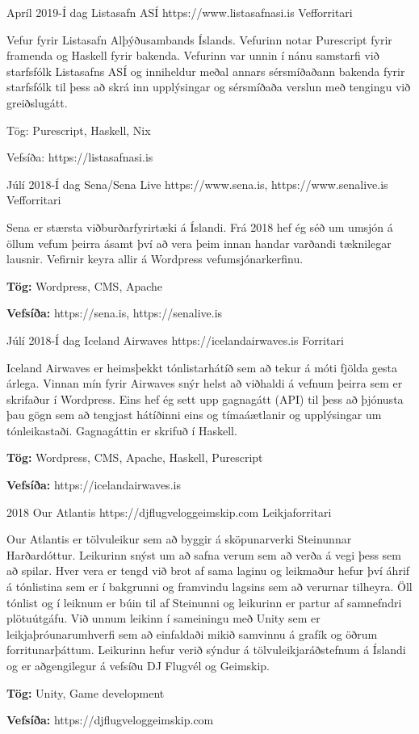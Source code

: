 \documentclass[10pt]{article} %
\begin{document}
\job
{Apríl 2019-}{Í dag}
{Listasafn ASÍ}
{https://www.listasafnasi.is}
{Vefforritari}
{Vefur fyrir Listasafn Alþýðusambands Íslands. Vefurinn notar Purescript fyrir framenda og Haskell fyrir bakenda. Vefurinn var unnin í nánu samstarfi við starfsfólk Listasafns ASÍ og inniheldur meðal annars sérsmíðaðann bakenda fyrir starfsfólk til þess að skrá inn upplýsingar og sérsmíðaða verslun með tengingu við greiðslugátt. \\
\rule{0mm}{5mm}Tög: Purescript, Haskell, Nix\\
\rule{0mm}{5mm}Vefsíða: https://listasafnasi.is}

\job
{Júlí 2018-}{Í dag}
{Sena/Sena Live}
{https://www.sena.is, https://www.senalive.is}
{Vefforritari}
{Sena er stærsta viðburðarfyrirtæki á Íslandi. Frá 2018 hef ég séð um umsjón á öllum vefum þeirra ásamt því að vera þeim innan handar varðandi tæknilegar lausnir. Vefirnir keyra allir á Wordpress vefumsjónarkerfinu.\\
\rule{0mm}{5mm}\textbf{Tög:} Wordpress, CMS, Apache\\
\rule{0mm}{5mm}\textbf{Vefsíða: }https://sena.is, https://senalive.is}

\job
{Júlí 2018-}{Í dag}
{Iceland Airwaves}
{https://icelandairwaves.is}
{Forritari}
{Iceland Airwaves er heimsþekkt tónlistarhátíð sem að tekur á móti fjölda gesta árlega. Vinnan mín fyrir Airwaves snýr helst að viðhaldi á vefnum þeirra sem er skrifaður í Wordpress. Eins hef ég sett upp gagnagátt (API) til þess að þjónusta þau gögn sem að tengjast hátíðinni eins og tímaáætlanir og upplýsingar um tónleikastaði. Gagnagáttin er skrifuð í Haskell.\\
\rule{0mm}{5mm}\textbf{Tög:} Wordpress, CMS, Apache, Haskell, Purescript\\
\rule{0mm}{5mm}\textbf{Vefsíða:} https://icelandairwaves.is
}

\newpage
\job
{2018}{}
{Our Atlantis}
{https://djflugveloggeimskip.com}
{Leikjaforritari}
{Our Atlantis er tölvuleikur sem að byggir á sköpunarverki Steinunnar Harðardóttur. Leikurinn snýst um að safna verum sem að verða á vegi þess sem að spilar. Hver vera er tengd við brot af sama laginu og leikmaður hefur því áhrif á tónlistina sem er í bakgrunni og framvindu lagsins sem að verurnar tilheyra. Öll tónlist og í leiknum er búin til af Steinunni og leikurinn er partur af samnefndri plötuútgáfu. Við unnum leikinn í sameiningu með Unity sem er leikjaþróunarumhverfi sem að einfaldaði mikið samvinnu á grafík og öðrum forritunarþáttum. Leikurinn hefur verið sýndur á tölvuleikjaráðstefnum á Íslandi og er aðgengilegur á vefsíðu DJ Flugvél og Geimskip. \\
\rule{0mm}{5mm}\textbf{Tög:} Unity, Game development\\
\rule{0mm}{5mm}\textbf{Vefsíða:} https://djflugveloggeimskip.com
}
\end{document}
